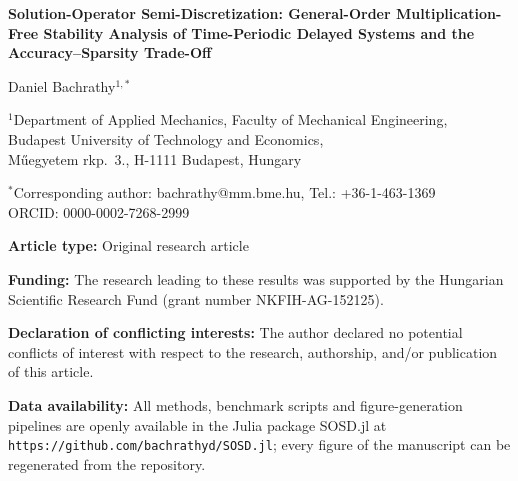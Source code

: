 \documentclass[11pt]{article}
\begin{document}
\begin{center}
{\LARGE\bfseries Solution-Operator Semi-Discretization: General-Order
Multiplication-Free Stability Analysis of Time-Periodic Delayed Systems and
the Accuracy--Sparsity Trade-Off}

\vspace{2em}

{\large Daniel Bachrathy$^{1,*}$}

\vspace{1em}

$^1$Department of Applied Mechanics, Faculty of Mechanical Engineering,\\
Budapest University of Technology and Economics,\\
M\H{u}egyetem rkp.~3., H-1111 Budapest, Hungary

\vspace{1em}

$^*$Corresponding author: bachrathy@mm.bme.hu, Tel.: +36-1-463-1369\\
ORCID: 0000-0002-7268-2999 
\end{center}

\vspace{2em}

\noindent\textbf{Article type:} Original research article

\vspace{1em}

\noindent\textbf{Funding:} The research leading to these results was
supported by the Hungarian Scientific Research Fund (grant number NKFIH-AG-152125).

\vspace{1em}

\noindent\textbf{Declaration of conflicting interests:} The author declared
no potential conflicts of interest with respect to the research, authorship,
and/or publication of this article.

\vspace{1em}

\noindent\textbf{Data availability:} All methods, benchmark scripts and
figure-generation pipelines are openly available in the Julia package
\textsf{SOSD.jl} at \texttt{https://github.com/bachrathyd/SOSD.jl}; every
figure of the manuscript can be regenerated from the repository.
\end{document}
